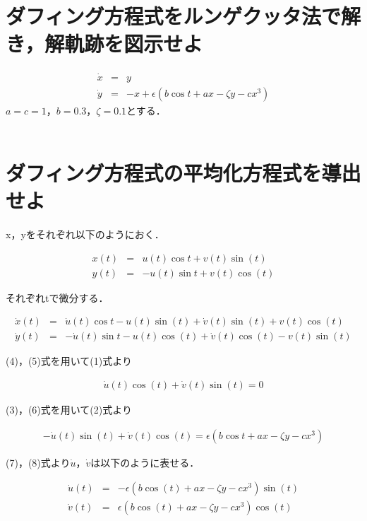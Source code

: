 	\section{ダフィング方程式をルンゲクッタ法で解き，解軌跡を図示せよ} \label{seq:sample}
		\begin{eqnarray}
			\dot{x} & = & y \\
			\dot{y} & = & -x + \epsilon (b \cos{t}+ax-\zeta y - cx^3)
		\end{eqnarray}
		$a=c=1$，$b=0.3$，$\zeta = 0.1$とする．\\
		\\
	\section{ダフィング方程式の平均化方程式を導出せよ} \label{seq:sample}

		x，yをそれぞれ以下のようにおく．

		\begin{eqnarray}
			x(t) & = & u(t) \cos{t} + v(t) \sin(t) \\
			y(t) & = & - u(t) \sin{t} + v(t) \cos(t)
		\end{eqnarray}

		それぞれtで微分する．

		\begin{eqnarray}
			\dot{x}(t) & = & \dot{u}(t) \cos{t} -u(t) \sin(t) + \dot{v}(t) \sin(t) +v(t) \cos(t) \\
			\dot{y}(t) & = & - \dot{u}(t) \sin{t} -u(t) \cos(t) + \dot{v}(t) \cos(t) - v(t) \sin(t)
		\end{eqnarray}

		(4)，(5)式を用いて(1)式より

		\begin{eqnarray}
			\dot{u}(t) \cos(t) + \dot{v}(t) \sin(t) = 0
		\end{eqnarray}

		(3)，(6)式を用いて(2)式より

		\begin{eqnarray}
			 - \dot{u}(t) \sin(t) + \dot{v}(t) \cos (t) = \epsilon (b \cos{t}+ax-\zeta y - cx^3)
		\end{eqnarray}

		(7)，(8)式より$\dot{u}$，$\dot{v}$は以下のように表せる．

		\begin{eqnarray}
			\dot{u}(t) & = & - \epsilon (b \cos(t)+ax-\zeta y - cx^3) \sin (t) \\
			\dot{v}(t) & = & \epsilon (b \cos(t)+ax-\zeta y - cx^3) \cos (t)
		\end{eqnarray}

